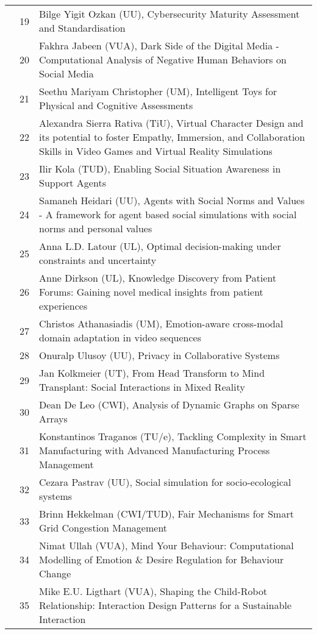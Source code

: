 \begin{xltabular}{\linewidth}{@{} l @{\hspace{0.5em}} l @{\hspace{1em}} X @{}}
	&	 19	&	Bilge Yigit Ozkan (UU), Cybersecurity Maturity Assessment and Standardisation \\
	&	 20	&	Fakhra Jabeen (VUA), Dark Side of the Digital Media - Computational Analysis of Negative Human Behaviors on Social Media \\
	&	 21	&	Seethu Mariyam Christopher (UM), Intelligent Toys for Physical and Cognitive Assessments \\
	&	 22	&	Alexandra Sierra Rativa (TiU), Virtual Character Design and its potential to foster Empathy, Immersion, and Collaboration Skills in Video Games and Virtual Reality Simulations \\
	&	 23	&	Ilir Kola (TUD), Enabling Social Situation Awareness in Support Agents \\
	&	 24	&	Samaneh Heidari (UU), Agents with Social Norms and Values - A framework for agent based social simulations with social norms and personal values \\
	&	 25	&	Anna L.D. Latour (UL), Optimal decision-making under constraints and uncertainty \\
	&	 26	&	Anne Dirkson (UL), Knowledge Discovery from Patient Forums: Gaining novel medical insights from patient experiences \\
	&	 27	&	Christos Athanasiadis (UM), Emotion-aware cross-modal domain adaptation in video sequences \\
	&	 28	&	Onuralp Ulusoy (UU), Privacy in Collaborative Systems \\
	&	 29	&	Jan Kolkmeier (UT), From Head Transform to Mind Transplant: Social Interactions in Mixed Reality \\
	&	 30	&	Dean De Leo (CWI), Analysis of Dynamic Graphs on Sparse Arrays \\
	&	 31	&	Konstantinos Traganos (TU/e), Tackling Complexity in Smart Manufacturing with Advanced Manufacturing Process Management \\
	&	 32	&	Cezara Pastrav (UU), Social simulation for socio-ecological systems \\
	&	 33	&	Brinn Hekkelman (CWI/TUD), Fair Mechanisms for Smart Grid Congestion Management \\
	&	 34	&	Nimat Ullah (VUA), Mind Your Behaviour: Computational Modelling of Emotion \& Desire Regulation for Behaviour Change \\
	&	 35	&	Mike E.U. Ligthart (VUA), Shaping the Child-Robot Relationship: Interaction Design Patterns for a Sustainable Interaction \\


\end{xltabular}
